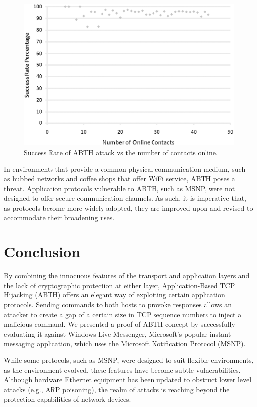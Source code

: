 \documentclass{sig-alternate}
\begin{document}
\begin{figure}[h]
	\centering
	\caption{Success Rate of ABTH attack vs the number of contacts online.}
	\label{fig:successrate}
	\includegraphics[width=\columnwidth]{graphics/plot.eps}
\end{figure}

In environments that provide a common physical communication medium, such as hubbed networks and coffee shops that offer WiFi service, ABTH poses a threat.
Application protocols vulnerable to ABTH, such as MSNP, were not designed to offer secure communication channels.
As such, it is imperative that, as protocols become more widely adopted, they are improved upon and revised to accommodate their broadening uses.

\section{Conclusion}
\label{sec:conclusion}

By combining the innocuous features of the transport and application layers and the lack of cryptographic protection at either layer, Application-Based TCP Hijacking (ABTH) offers an elegant way of exploiting certain application protocols.
Sending commands to both hosts to provoke responses allows an attacker to create a gap of a certain size in TCP sequence numbers to inject a malicious command.
We presented a proof of ABTH concept by successfully evaluating it against Windows Live Messenger, Microsoft's popular instant messaging application, which uses the Microsoft Notification Protocol (MSNP).

While some protocols, such as MSNP, were designed to suit flexible environments, as the environment evolved, these features have become subtle vulnerabilities.
Although hardware Ethernet equipment has been updated to obstruct lower level attacks (e.g., ARP poisoning), the realm of attacks is reaching beyond the protection capabilities of network devices.



\end{document}
